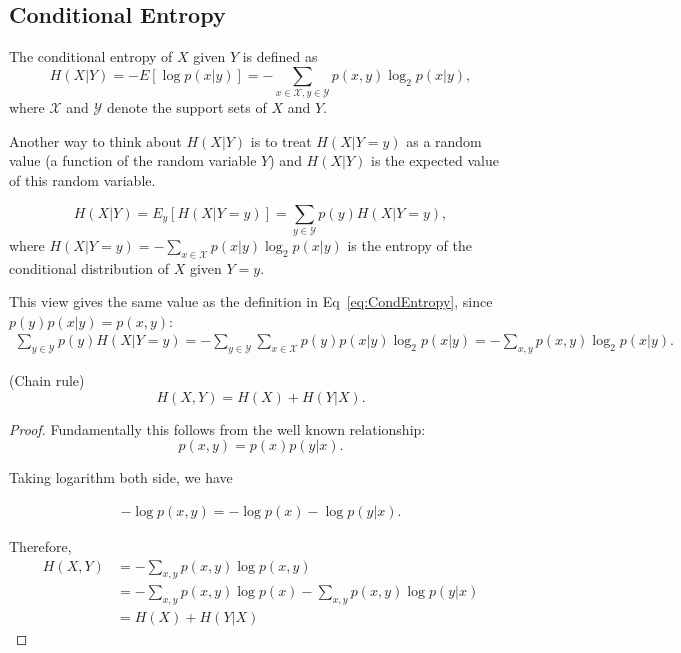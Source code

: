 \subsection{Conditional Entropy} 
The conditional entropy of \(X\) given \(Y\) is defined as
\begin{equation}
H(X|Y) = - E[\log {p(x|y)}] = - \sum_{x \in \mathcal{X}, y \in \mathcal{Y}} p(x,y) \log_{2} p(x|y), \label{eq:CondEntropy}
\end{equation}
where \(\mathcal{X}\) and \(\mathcal{Y}\) denote the support sets of \(X\) and \(Y\). 

Another way to think about \(H(X|Y)\) is to treat \(H(X|Y=y)\) as a random value (a function of the random variable \(Y\)) and \(H(X|Y)\) is the expected value of this random variable. 

\begin{equation}
H(X|Y) = E_y[H(X|Y=y)] = \sum_{y \in \mathcal{Y}} p(y) H(X|Y=y), \label{eq:CondEntropy2}
\end{equation}
where \(H(X|Y=y) = -\sum_{x \in \mathcal{X}} p(x|y) \log_2 p(x|y)\) is the entropy of the conditional distribution of \(X\) given \(Y=y\).

This view gives the same value as the definition in Eq~\ref{eq:CondEntropy}, since \(p(y)p(x|y) = p(x,y)\):
\begin{align*}
\sum_{y \in \mathcal{Y}} p(y) H(X|Y=y) = -\sum_{y \in \mathcal{Y}} \sum_{x \in \mathcal{X}} p(y) p(x|y) \log_2 p(x|y) = -\sum_{x,y} p(x,y) \log_2 p(x|y).
\end{align*}


\begin{theorem} (Chain rule)
\begin{equation}
    H(X,Y) = H(X) + H(Y|X).
\end{equation}
\end{theorem}

\begin{proof}
Fundamentally this follows from the well known relationship:
\begin{equation*}
p(x,y) = p(x)p(y|x).
\end{equation*}

Taking logarithm both side, we have 

\begin{align*}
-\log p(x,y) = -\log p(x) - \log p(y|x).
\end{align*}

Therefore, 
\begin{align*}
    H(X,Y) &= - \sum_{x,y} p(x,y) \log p(x,y) \\
           &= - \sum_{x,y} p(x,y) \log p(x) - \sum_{x,y} p(x,y) \log p(y|x)  \\
           &= H(X) + H(Y|X)
\end{align*}

\end{proof}


